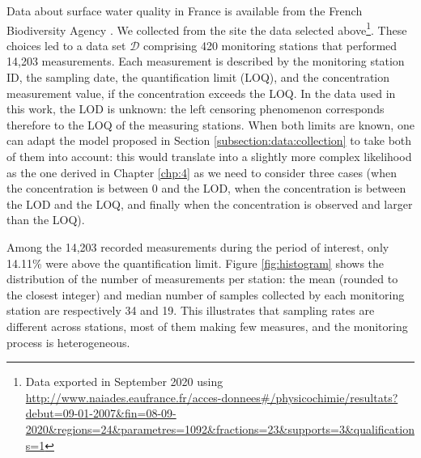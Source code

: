 Data about surface water quality in France is available from the French Biodiversity Agency \cite{Naiade}. We collected from the site the data selected above\footnote{Data exported in September 2020 using \url{http://www.naiades.eaufrance.fr/acces-donnees\#/physicochimie/resultats?debut=09-01-2007&fin=08-09-2020&regions=24&parametres=1092&fractions=23&supports=3&qualifications=1}}. 
These choices led to a data set $\mathcal D$ comprising 420 monitoring stations that performed 14,203 measurements. Each measurement is described by the monitoring station ID, the sampling date, the quantification limit (LOQ), and the concentration measurement value, if the concentration exceeds the LOQ. 
In the data used in this work, the LOD is unknown: the left censoring phenomenon corresponds therefore to the LOQ of the measuring stations. When both limits are known, one can adapt the model proposed in Section \ref{subsection:data:collection} to take both of them into account: this would translate into a slightly more complex likelihood as the one derived in Chapter \ref{chp:4} as we need to consider three cases (when the concentration is between 0 and the LOD, when the concentration is between the LOD and the LOQ, and finally when the concentration is observed and larger than the LOQ). 

Among the 14,203 recorded measurements during the period of interest, only 14.11\% were above the quantification limit. Figure \ref{fig:histogram} shows the distribution of the number of measurements per station: the mean (rounded to the closest integer) and median number of samples collected by each monitoring station are respectively 34 and 19. This illustrates that sampling rates are different across stations, most of them making few measures, and the monitoring process is heterogeneous.

